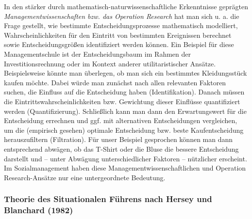 \documentclass[
  letterpaper,
]{book}
\begin{document}
In den stärker durch mathematisch-naturwissenschaftliche Erkenntnisse
geprägten \emph{Managementwissenschaften bzw. das Operation Research}
hat man sich u. a. die Frage gestellt, wie bestimmte
Entscheidungsprozesse mathematisch modelliert, Wahrscheinlichkeiten für
den Eintritt von bestimmten Ereignissen berechnet sowie
Entscheidungsgrößen identifiziert werden können. Ein Beispiel für diese
Managementschule ist der Entscheidungsbaum im Rahmen der
Investitionsrechnung oder im Kontext anderer utilitaristischer Ansätze.
Beispielsweise könnte man überlegen, ob man sich ein bestimmtes
Kleidungsstück kaufen möchte. Dabei würde man zunächst nach allen
relevanten Faktoren suchen, die Einfluss auf die Entscheidung haben
(Identifikation). Danach müssen die Eintrittswahrscheinlichkeiten bzw.
Gewichtung dieser Einflüsse quantifiziert werden (Quantifizierung).
Schließlich kann man dann den Erwartungswert für die Entscheidung
errechnen und ggf. mit alternativen Entscheidungen vergleichen, um die
(empirisch gesehen) optimale Entscheidung bzw. beste Kaufentscheidung
herauszufiltern (Filtration). Für unser Beispiel gesprochen können man
dann entsprechend abwägen, ob das T-Shirt oder die Bluse die bessere
Entscheidung darstellt und -- unter Abwägung unterschiedlicher Faktoren
-- nützlicher erscheint. Im Sozialmanagement haben diese
Managementwissenschaftlichen und Operation Research-Ansätze nur eine
untergeordnete Bedeutung.

\subsubsection{Theorie des Situationalen Führens nach Hersey und
Blanchard
(1982)}\label{theorie-des-situationalen-fuxfchrens-nach-hersey-und-blanchard-hersey1982leadership}
\end{document}
